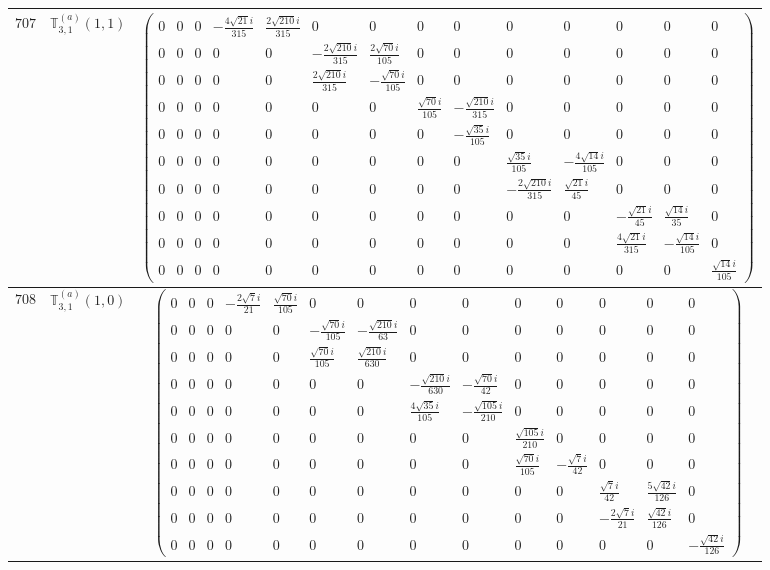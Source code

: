 \documentclass[fleqn,8pt,landscape]{jsarticle}
\begin{document}
\begin{center}
\begin{longtable}{ccc}
$ 707 $ & $ \mathbb{T}_{3,1}^{(a)}(1,1) $ & $ \begin{pmatrix} 0 & 0 & 0 & - \frac{4 \sqrt{21} i}{315} & \frac{2 \sqrt{210} i}{315} & 0 & 0 & 0 & 0 & 0 & 0 & 0 & 0 & 0 \\ 0 & 0 & 0 & 0 & 0 & - \frac{2 \sqrt{210} i}{315} & \frac{2 \sqrt{70} i}{105} & 0 & 0 & 0 & 0 & 0 & 0 & 0 \\ 0 & 0 & 0 & 0 & 0 & \frac{2 \sqrt{210} i}{315} & - \frac{\sqrt{70} i}{105} & 0 & 0 & 0 & 0 & 0 & 0 & 0 \\ 0 & 0 & 0 & 0 & 0 & 0 & 0 & \frac{\sqrt{70} i}{105} & - \frac{\sqrt{210} i}{315} & 0 & 0 & 0 & 0 & 0 \\ 0 & 0 & 0 & 0 & 0 & 0 & 0 & 0 & - \frac{\sqrt{35} i}{105} & 0 & 0 & 0 & 0 & 0 \\ 0 & 0 & 0 & 0 & 0 & 0 & 0 & 0 & 0 & \frac{\sqrt{35} i}{105} & - \frac{4 \sqrt{14} i}{105} & 0 & 0 & 0 \\ 0 & 0 & 0 & 0 & 0 & 0 & 0 & 0 & 0 & - \frac{2 \sqrt{210} i}{315} & \frac{\sqrt{21} i}{45} & 0 & 0 & 0 \\ 0 & 0 & 0 & 0 & 0 & 0 & 0 & 0 & 0 & 0 & 0 & - \frac{\sqrt{21} i}{45} & \frac{\sqrt{14} i}{35} & 0 \\ 0 & 0 & 0 & 0 & 0 & 0 & 0 & 0 & 0 & 0 & 0 & \frac{4 \sqrt{21} i}{315} & - \frac{\sqrt{14} i}{105} & 0 \\ 0 & 0 & 0 & 0 & 0 & 0 & 0 & 0 & 0 & 0 & 0 & 0 & 0 & \frac{\sqrt{14} i}{105} \end{pmatrix} $ \\ \hline
$ 708 $ & $ \mathbb{T}_{3,1}^{(a)}(1,0) $ & $ \begin{pmatrix} 0 & 0 & 0 & - \frac{2 \sqrt{7} i}{21} & \frac{\sqrt{70} i}{105} & 0 & 0 & 0 & 0 & 0 & 0 & 0 & 0 & 0 \\ 0 & 0 & 0 & 0 & 0 & - \frac{\sqrt{70} i}{105} & - \frac{\sqrt{210} i}{63} & 0 & 0 & 0 & 0 & 0 & 0 & 0 \\ 0 & 0 & 0 & 0 & 0 & \frac{\sqrt{70} i}{105} & \frac{\sqrt{210} i}{630} & 0 & 0 & 0 & 0 & 0 & 0 & 0 \\ 0 & 0 & 0 & 0 & 0 & 0 & 0 & - \frac{\sqrt{210} i}{630} & - \frac{\sqrt{70} i}{42} & 0 & 0 & 0 & 0 & 0 \\ 0 & 0 & 0 & 0 & 0 & 0 & 0 & \frac{4 \sqrt{35} i}{105} & - \frac{\sqrt{105} i}{210} & 0 & 0 & 0 & 0 & 0 \\ 0 & 0 & 0 & 0 & 0 & 0 & 0 & 0 & 0 & \frac{\sqrt{105} i}{210} & 0 & 0 & 0 & 0 \\ 0 & 0 & 0 & 0 & 0 & 0 & 0 & 0 & 0 & \frac{\sqrt{70} i}{105} & - \frac{\sqrt{7} i}{42} & 0 & 0 & 0 \\ 0 & 0 & 0 & 0 & 0 & 0 & 0 & 0 & 0 & 0 & 0 & \frac{\sqrt{7} i}{42} & \frac{5 \sqrt{42} i}{126} & 0 \\ 0 & 0 & 0 & 0 & 0 & 0 & 0 & 0 & 0 & 0 & 0 & - \frac{2 \sqrt{7} i}{21} & \frac{\sqrt{42} i}{126} & 0 \\ 0 & 0 & 0 & 0 & 0 & 0 & 0 & 0 & 0 & 0 & 0 & 0 & 0 & - \frac{\sqrt{42} i}{126} \end{pmatrix} $ \\ \hline

\end{longtable}
\end{center}
\end{document}
